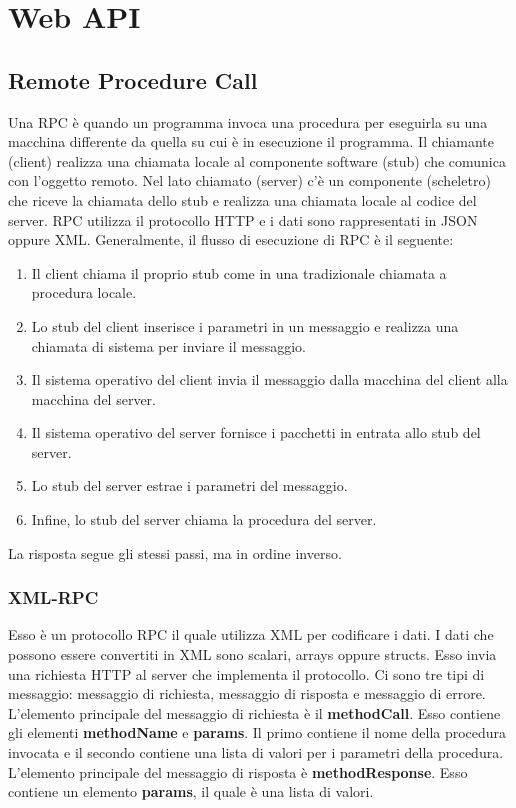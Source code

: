 \chapter{Web API}
\section{Remote Procedure Call}
Una RPC è quando un programma invoca una procedura per eseguirla su una macchina differente da quella su cui è in esecuzione il programma. Il chiamante (client) realizza una chiamata locale al componente software (stub) che comunica con l'oggetto remoto. Nel lato chiamato (server) c'è un componente (scheletro) che riceve la chiamata dello stub e realizza una chiamata locale al codice del server. RPC utilizza il protocollo HTTP e i dati sono rappresentati in JSON oppure XML. Generalmente, il flusso di esecuzione di RPC è il seguente:
\begin{enumerate}
\item Il client chiama il proprio stub come in una tradizionale chiamata a procedura locale.
\item Lo stub del client inserisce i parametri in un messaggio e realizza una chiamata di sistema per inviare il messaggio.
\item Il sistema operativo del client invia il messaggio dalla macchina del client alla macchina del server.
\item Il sistema operativo del server fornisce i pacchetti in entrata allo stub del server.
\item Lo stub del server estrae i parametri del messaggio.
\item Infine, lo stub del server chiama la procedura del server.
\end{enumerate}
La risposta segue gli stessi passi, ma in ordine inverso.
\subsection{XML-RPC}
Esso è un protocollo RPC il quale utilizza XML per codificare i dati. I dati che possono essere convertiti in XML sono scalari, arrays oppure structs. Esso invia una richiesta HTTP al server che implementa il protocollo. Ci sono tre tipi di messaggio: messaggio di richiesta, messaggio di risposta e messaggio di errore. L'elemento principale del messaggio di richiesta è il \textbf{methodCall}. Esso contiene gli elementi \textbf{methodName} e \textbf{params}. Il primo contiene il nome della procedura invocata e il secondo contiene una lista di valori per i parametri della procedura. L'elemento principale del messaggio di risposta è \textbf{methodResponse}. Esso contiene un elemento \textbf{params}, il quale è una lista di valori.
